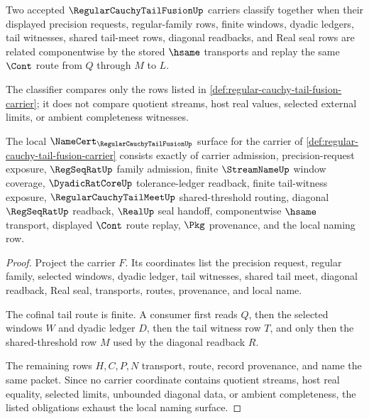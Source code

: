 \begin{definition}
\label{def:regular-cauchy-tail-fusion-classifier}
Two accepted $\RegularCauchyTailFusionUp$ carriers classify together when their displayed precision requests, regular-family rows, finite windows, dyadic ledgers, tail witnesses, shared tail-meet rows, diagonal readbacks, and Real seal rows are related componentwise by the stored $\hsame$ transports and replay the same $\Cont$ route from $Q$ through $M$ to $L$.

The classifier compares only the rows listed in \autoref{def:regular-cauchy-tail-fusion-carrier}; it does not compare quotient streams, host real values, selected external limits, or ambient completeness witnesses.
\end{definition}

\begin{theorem}
\label{thm:regular-cauchy-tail-fusion-namecert-obligations}
The local $\NameCert_{\RegularCauchyTailFusionUp}$ surface for the carrier of \autoref{def:regular-cauchy-tail-fusion-carrier} consists exactly of carrier admission, precision-request exposure, $\RegSeqRatUp$ family admission, finite $\StreamNameUp$ window coverage, $\DyadicRatCoreUp$ tolerance-ledger readback, finite tail-witness exposure, $\RegularCauchyTailMeetUp$ shared-threshold routing, diagonal $\RegSeqRatUp$ readback, $\RealUp$ seal handoff, componentwise $\hsame$ transport, displayed $\Cont$ route replay, $\Pkg$ provenance, and the local naming row.
\end{theorem}
\begin{proof}
Project the carrier $F$. Its coordinates list the precision request, regular family, selected windows, dyadic ledger, tail witnesses, shared tail meet, diagonal readback, Real seal, transports, routes, provenance, and local name.

The cofinal tail route is finite. A consumer first reads $Q$, then the selected windows $W$ and dyadic ledger $D$, then the tail witness row $T$, and only then the shared-threshold row $M$ used by the diagonal readback $R$.

The remaining rows $H,C,P,N$ transport, route, record provenance, and name the same packet. Since no carrier coordinate contains quotient streams, host real equality, selected limits, unbounded diagonal data, or ambient completeness, the listed obligations exhaust the local naming surface.
\end{proof}

